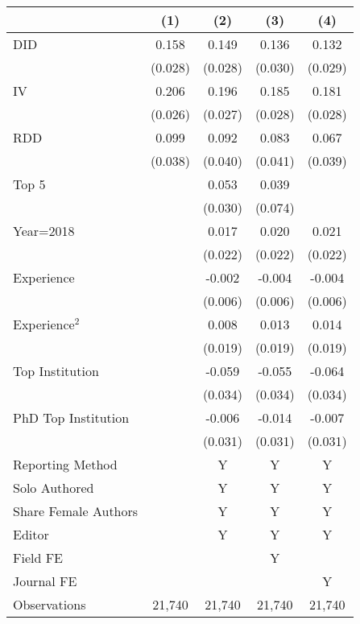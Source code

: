 \begin{tabular}{l*{4}{c}}
\hline\hline
                &\multicolumn{1}{c}{(1)}&\multicolumn{1}{c}{(2)}&\multicolumn{1}{c}{(3)}&\multicolumn{1}{c}{(4)}\\
\hline
DID             &    0.158&    0.149&    0.136&    0.132\\
                &  (0.028)&  (0.028)&  (0.030)&  (0.029)\\
IV              &    0.206&    0.196&    0.185&    0.181\\
                &  (0.026)&  (0.027)&  (0.028)&  (0.028)\\
RDD             &    0.099&    0.092&    0.083&    0.067\\
                &  (0.038)&  (0.040)&  (0.041)&  (0.039)\\
Top 5           &         &    0.053&    0.039&         \\
                &         &  (0.030)&  (0.074)&         \\
Year=2018       &         &    0.017&    0.020&    0.021\\
                &         &  (0.022)&  (0.022)&  (0.022)\\
Experience      &         &   -0.002&   -0.004&   -0.004\\
                &         &  (0.006)&  (0.006)&  (0.006)\\
Experience$^2$  &         &    0.008&    0.013&    0.014\\
                &         &  (0.019)&  (0.019)&  (0.019)\\
Top Institution &         &   -0.059&   -0.055&   -0.064\\
                &         &  (0.034)&  (0.034)&  (0.034)\\
PhD Top Institution&         &   -0.006&   -0.014&   -0.007\\
                &         &  (0.031)&  (0.031)&  (0.031)\\
Reporting Method &         &        Y&        Y&        Y\\
Solo Authored   &         &        Y&        Y&        Y\\
Share Female Authors &         &        Y&        Y&        Y\\
Editor          &         &        Y&        Y&        Y\\
Field FE        &         &         &        Y&         \\
Journal FE      &         &         &         &        Y\\
\hline
Observations    &   21,740&   21,740&   21,740&   21,740\\
\hline\hline
\end{tabular}
